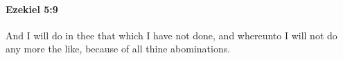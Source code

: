 
		\paragraph{Ezekiel 5:9} %
			\label{EZEKIEL-5-9}

			And I will do in thee that which I have not done, and whereunto I will not do any more the like, because of all thine abominations.


